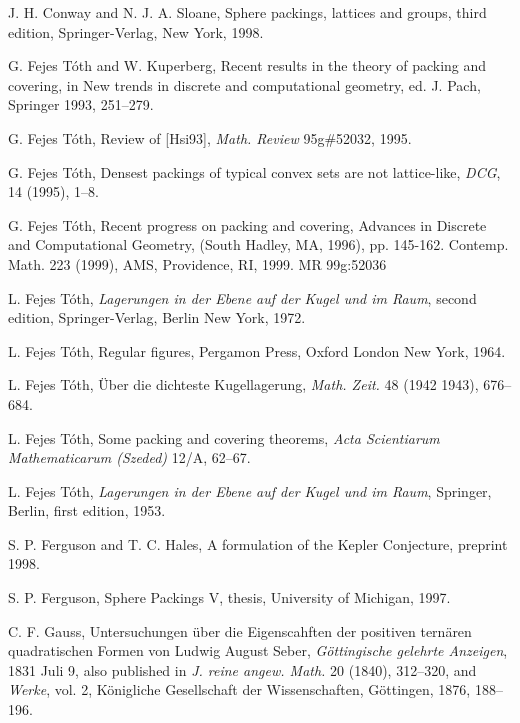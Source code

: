  J. H. Conway and N. J. A. Sloane, Sphere packings, lattices
    and groups,  third edition, Springer-Verlag, New York,
    1998.

 G. Fejes T\'oth and W. Kuperberg, Recent results in the
    theory of packing and covering, in New trends in
    discrete and computational geometry, ed. J. Pach, Springer
    1993, 251--279.

 G. Fejes T\'oth, Review of [Hsi93], {\it Math. Review} 95g\#52032, 1995.

 G. Fejes T\'oth, Densest packings of typical convex sets
    are not lattice-like, {\it DCG}, 14 (1995), 1--8.

 G. Fejes T\'oth, Recent progress on packing and covering,
     Advances
in Discrete and Computational Geometry, (South Hadley, MA, 1996),
pp. 145-162. Contemp. Math. 223 (1999), AMS, Providence, RI, 1999.
MR 99g:52036


 L. Fejes T\'oth, {\it Lagerungen in der Ebene auf der
    Kugel und im Raum}, second edition,
    Springer-Verlag, Berlin New York, 1972.

 L. Fejes T\'oth, Regular figures, Pergamon Press,
    Oxford London New York, 1964.

 L. Fejes T\'oth,  \"Uber die dichteste Kugellagerung,
{\it Math. Zeit.} 48 (1942 1943), 676--684.

 L. Fejes T\'oth, Some packing and covering theorems,
    {\it Acta Scientiarum Mathematicarum (Szeded)} 12/A, 62--67.

 L. Fejes T\'oth, {\it Lagerungen in der Ebene auf
der Kugel und im Raum}, Springer, Berlin, first edition, 1953.

 S. P. Ferguson and T. C. Hales, A formulation of
the Kepler Conjecture, preprint 1998.

 S. P. Ferguson, Sphere Packings V, thesis, University of
Michigan, 1997.

 C. F. Gauss, Untersuchungen \"uber die Eigenscahften der
positiven tern\"aren quadratischen Formen von Ludwig August Seber,
    {\it G\"ottingische gelehrte Anzeigen}, 1831 Juli 9,
also published in {\it J. reine angew. Math.} 20 (1840), 312--320,
and
    {\it Werke},  vol. 2,
    K\"onigliche Gesellschaft der Wissenschaften, G\"ottingen,
            1876, 188--196.

